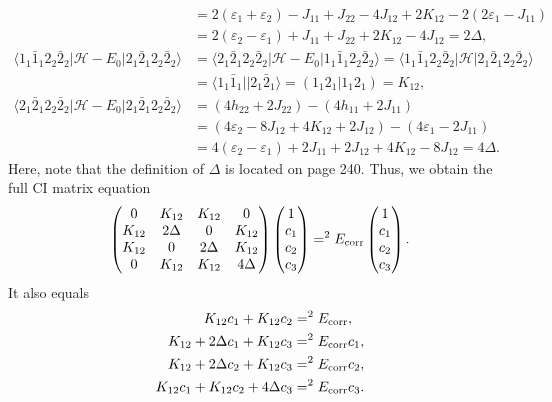 \documentclass[a4paper]{book}
\newcommand{\corr}{{\rm corr}}
\begin{document}
\begin{solution}
\begin{itemize}
\begin{align*}
		 &= 2( \varepsilon_1 + \varepsilon_2 ) - J_{11} + J_{22} - 4J_{12} + 2K_{12} - 2( 2\varepsilon_1 - J_{11} ) \\
		 &= 2( \varepsilon_2 - \varepsilon_1 ) + J_{11} + J_{22} + 2K_{12} - 4J_{12} = 2 \Delta , \\
		 \langle 1_1 \bar{1}_1 2_2 \bar{2}_2 | \mathscr{H} - E_0 | 2_1 \bar{2}_1 2_2 \bar{2}_2 \rangle &= \langle 2_1 \bar{2}_1 2_2 \bar{2}_2 | \mathscr{H} - E_0 | 1_1 \bar{1}_1 2_2 \bar{2}_2 \rangle = \langle 1_1 \bar{1}_1 2_2 \bar{2}_2 | \mathscr{H} | 2_1 \bar{2}_1 2_2 \bar{2}_2 \rangle \\
		 &= \langle 1_1 \bar{1}_1 || 2_1 \bar{2}_1 \rangle = ( 1_1 2_1 | 1_1 2_1 ) = K_{12} , \\
		 \langle 2_1 \bar{2}_1 2_2 \bar{2}_2 | \mathscr{H} - E_0 | 2_1 \bar{2}_1 2_2 \bar{2}_2 \rangle &= (4h_{22} + 2J_{22}) - (4h_{11} + 2J_{11}) \\
		 &= ( 4\varepsilon_2 - 8J_{12} + 4K_{12} + 2J_{12} ) - ( 4\varepsilon_1 - 2J_{11} ) \\
		 &= 4( \varepsilon_2 - \varepsilon_1 ) + 2J_{11} + 2J_{12} + 4K_{12} - 8J_{12} = 4\Delta.
	\end{align*}
	Here, note that the definition of $\Delta$ is located on page 240. Thus, we obtain the full CI matrix equation
	\begin{equation}
		\begin{pmatrix}
			0 		& K_{12} 	& K_{12} 	& 0 		\\
			K_{12} 	& 2\Delta 	& 0 		& K_{12} 	\\
			K_{12} 	& 0			& 2\Delta 	& K_{12}	 \\
			0 		& K_{12} 	& K_{12} 	& 4\Delta
		\end{pmatrix}
		\begin{pmatrix}
			1 \\ c_1 \\ c_2 \\ c_3
		\end{pmatrix} = ^2 E_\corr \begin{pmatrix}
			1 \\ c_1 \\ c_2 \\ c_3
		\end{pmatrix}.
	\end{equation}
	It also equals
	\begin{align*}
		K_{12} c_1 + K_{12} c_2 &= ^2 E_\corr , \\
		K_{12} + 2\Delta c_1 + K_{12} c_3 &= ^2 E_\corr c_1 , \\
		K_{12} + 2\Delta c_2 + K_{12} c_3 &= ^2 E_\corr c_2 , \\
		K_{12} c_1 + K_{12} c_2 + 4\Delta c_3 &= ^2 E_\corr c_3.
	\end{align*}
	

\end{itemize}
\end{solution}
\end{document}
